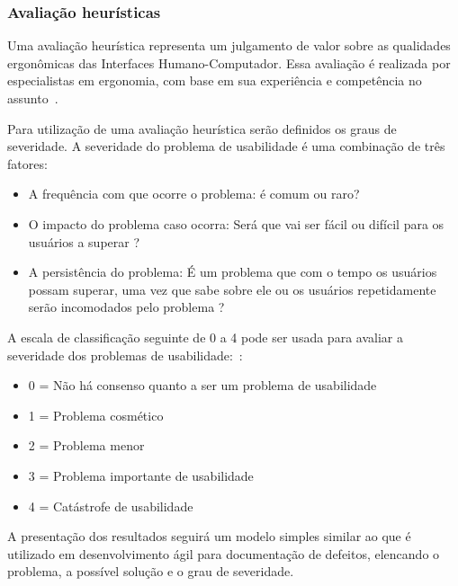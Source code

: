 \subsubsection{Avaliação heurísticas}
\label{avaliacao-heuristica}
Uma avaliação heurística representa um julgamento de valor sobre as qualidades
ergonômicas das Interfaces Humano-Computador. Essa avaliação é realizada por
especialistas em ergonomia, com base em sua experiência e competência no
assunto~\cite{cybis2010}.

%
Para utilização de uma avaliação heurística serão definidos os graus de
severidade. A severidade do problema de usabilidade é uma combinação de três fatores:
\begin{itemize}
\item A frequência com que ocorre o problema: é comum ou raro?
\item O impacto do problema caso ocorra: Será que vai ser fácil ou difícil para os usuários a superar ?
\item A persistência do problema: É um problema que com o tempo os usuários possam superar, uma vez que sabe sobre ele ou os usuários repetidamente serão incomodados pelo problema ?
\end{itemize}

A escala de classificação seguinte de 0 a 4 pode ser usada para avaliar a severidade dos problemas de usabilidade:~\cite{nielsen1995severity}:

\begin{itemize}

    \item 0 = Não há consenso quanto a ser um problema de usabilidade

    \item 1 = Problema cosmético

    \item 2 = Problema menor
	
    \item 3 = Problema importante de usabilidade

    \item 4 = Catástrofe de usabilidade

\end{itemize}

A presentação dos resultados seguirá um modelo simples similar ao que é
utilizado em desenvolvimento ágil para documentação de defeitos, elencando o
problema, a possível solução e o grau de severidade.

